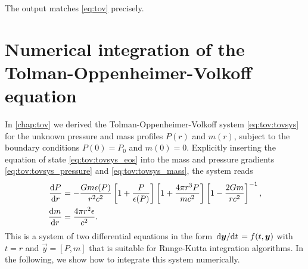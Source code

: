 
The output matches \cref{eq:tov} precisely.

\chapter{Numerical integration of the Tolman-Oppenheimer-Volkoff equation}
\label{sec:nstars:numtov}

In \cref{chap:tov} we derived the Tolman-Oppenheimer-Volkoff system \eqref{eq:tov:tovsys} for the unknown pressure and mass profiles $P(r)$ and $m(r)$, subject to the boundary conditions $P(0) = P_0$ and $m(0) = 0$.
Explicitly inserting the equation of state \eqref{eq:tov:tovsys_eos} into the mass and pressure gradients \eqref{eq:tov:tovsys_pressure} and \eqref{eq:tov:tovsys_mass}, the system reads
\begin{subequations}
\label{eq:numtov:tovsys}
\begin{align}
	\odv{P}{r} &= -\frac{G m \epsilon(P)}{r^2 c^2} \left[ 1 + \frac{P}{\epsilon(P)} \right] \left[ 1 + \frac{4 \pi r^3 P}{m c^2} \right] \left[ 1 - \frac{2 G m}{r c^2} \right]^{-1} , \label{eq:numtov:tov_pressure} \\
	\odv{m}{r} &= \frac{4 \pi r^2 \epsilon}{c^2} . \label{eq:numtov:tov_mass}
\end{align}
\end{subequations}
This is a system of two differential equations in the form $\odv{\vec{y}}/{t} = f(t, \vec{y})$ with $t=r$ and $\vec{y} = [P, m]$ that is suitable for Runge-Kutta integration algorithms.
In the following, we show how to integrate this system numerically.

